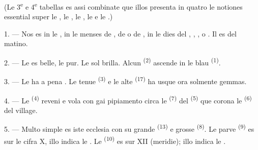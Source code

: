 
\VUsaut{3.0mm}
\VUsaut{1.6mm}
\VUsaut{3.4mm}

(Le 3\textsuperscript{e} e 4\textsuperscript{e} tabellas es assi combinate que
illos presenta in quatro  le notiones essential super
le , le , le , le
 e le .)
\VUsaut{4.0mm}

\VUsaut{3.0mm}

\VUsaut{2.4mm}

\VUsaut{3.0mm}

1. --- Nos es in le , in le menses de , de
 o de , in le dies del ,
, , o . Il es  del matino.

2. --- Le  es belle, le  pur. Le sol brilla. Alcun
 \textsuperscript{(2)} ascende in le blau 
\textsuperscript{(1)}.

3. --- Le  ha a pena . Le tenue 
\textsuperscript{(3)} e le alte  \textsuperscript{(17)} ha
usque ora solmente gemmas.

4. --- Le  \textsuperscript{(4)} reveni e vola con gai
pipiamento circa le  \textsuperscript{(7)} del 
\textsuperscript{(5)} que corona le  \textsuperscript{(6)} del
village.

\VUsaut{3.4mm}
\VUsaut{3.0mm}

5. --- Multo simple es iste ecclesia con su grande 
\textsuperscript{(13)} e grosse  \textsuperscript{(8)}. Le
parve  \textsuperscript{(9)} es sur le cifra X, illo indica le
. Le  \textsuperscript{(10)} es sur XII (meridie);
illo indica le .

